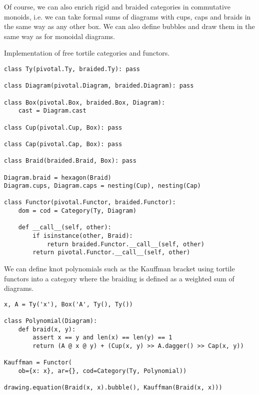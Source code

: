 Of course, we can also enrich rigid and braided categories in commutative monoids, i.e. we can take formal sums of diagrams with cups, caps and braids in the same way as any other box.
We can also define bubbles and draw them in the same way as for monoidal diagrams.

\begin{python}
{\normalfont Implementation of free tortile categories and functors.}

\begin{verbatim}
class Ty(pivotal.Ty, braided.Ty): pass

class Diagram(pivotal.Diagram, braided.Diagram): pass

class Box(pivotal.Box, braided.Box, Diagram):
    cast = Diagram.cast

class Cup(pivotal.Cup, Box): pass

class Cap(pivotal.Cap, Box): pass

class Braid(braided.Braid, Box): pass

Diagram.braid = hexagon(Braid)
Diagram.cups, Diagram.caps = nesting(Cup), nesting(Cap)

class Functor(pivotal.Functor, braided.Functor):
    dom = cod = Category(Ty, Diagram)

    def __call__(self, other):
        if isinstance(other, Braid):
            return braided.Functor.__call__(self, other)
        return pivotal.Functor.__call__(self, other)
\end{verbatim}
\end{python}

\begin{example}
We can define knot polynomials such as the Kauffman bracket using tortile functors into a category where the braiding is defined as a weighted sum of diagrams.

\begin{verbatim}
x, A = Ty('x'), Box('A', Ty(), Ty())

class Polynomial(Diagram):
    def braid(x, y):
        assert x == y and len(x) == len(y) == 1
        return (A @ x @ y) + (Cup(x, y) >> A.dagger() >> Cap(x, y))

Kauffman = Functor(
    ob={x: x}, ar={}, cod=Category(Ty, Polynomial))

drawing.equation(Braid(x, x).bubble(), Kauffman(Braid(x, x)))
\end{verbatim}

\end{example}
